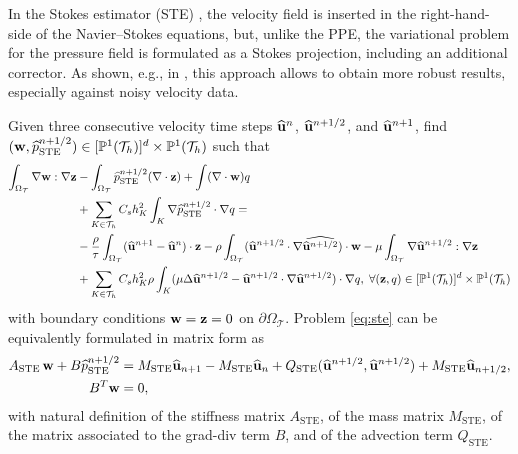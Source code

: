 In the Stokes estimator (STE) \cite{svihlova_2016}, the velocity field is inserted in the right-hand-side of the Navier--Stokes equations, but, unlike the PPE, the 
variational problem for the pressure field is formulated as a Stokes projection, including an additional corrector. As shown, e.g.,  in \cite{bertoglio2018relative}, this approach allows to 
obtain more robust results, especially against noisy velocity data.
\begin{problem}[STE]
  \label{def:ste}
    Given three consecutive velocity time steps $\widehat{\mathbf{u}}^{n}$, $\widehat{\mathbf{u}}^{n+1/2}$, and $\widehat{\mathbf{u}}^{n+1}$, find $(\mathbf{w},\widehat{p}^{n+1/2}_{\text{STE}})\in [\mathbb{P}^1(\mathcal{T}_h)]^d \times \mathbb{P}^1(\mathcal{T}_h)$ such that
  \begin{equation}\label{eq:ste-weak}
  \begin{aligned}
    \int_{\Omega_{\mathcal T}} \nabla\mathbf{w}:\nabla\mathbf{z} &- \int_{\Omega_{\mathcal T}} \widehat{p}^{n+1/2}_{\text{STE}}(\nabla\cdot\mathbf{z})+\int(\nabla\cdot\mathbf{w})q\\
     &+ \sum_{K\in\mathcal{T}_h}C_s h^2_K\int_K \nabla \widehat{p}^{n+1/2}_{\text{STE}}\cdot\nabla q=\\
     &-\frac{\rho}{\tau}\int_{\Omega_{\mathcal T}} (\widehat{\mathbf{u}}^{n+1}-\widehat{\mathbf{u}}^{n})\cdot\mathbf{z} - \rho\int_{\Omega_{\mathcal T}} (\widehat{\mathbf{u}}^{n+1/2}\cdot\nabla\widehat{\widehat{\mathbf{u}}^{n+1/2}})\cdot\mathbf{w}-\mu\int_{\Omega_{\mathcal T}} \nabla\widehat{\mathbf{u}}^{n+1/2}:\nabla\mathbf{z}\\
     &+\sum_{K\in\mathcal{T}_h}C_s h^2_K\rho\int_K (\mu\Delta\widehat{\mathbf{u}}^{n+1/2}-\widehat{\mathbf{u}}^{n+1/2}\cdot\nabla\widehat{\mathbf{u}}^{n+1/2})\cdot\nabla q,
\;     \forall (\mathbf{z},q) \in [\mathbb{P}^1(\mathcal{T}_h)]^d \times \mathbb{P}^1(\mathcal{T}_h)
  \end{aligned}
  \end{equation}
    with boundary conditions $\mathbf{w}=\mathbf{z}=0$ on $\partial \Omega_{\mathcal T}$. %
Problem \eqref{eq:ste} can be equivalently formulated in matrix form as
  \begin{equation}\label{eq:ste}
    \begin{aligned}
     A_{\text{STE}}\,\mathbf{w} + B \widehat{p}^{n+1/2}_{\text{STE}} &= M_{\text{STE}}\widehat{\mathbf{u}}_{n+1} - M_{\text{STE}}\widehat{\mathbf{u}}_{n} + Q_{\text{STE}}(\widehat{\mathbf{u}}^{n+1/2}, \widehat{\mathbf{u}}^{n+1/2}) + M_{\text{STE}}\widehat{\mathbf{u}}_{n+1/2},\\
     B^T\mathbf{w} &= 0,
  \end{aligned}
  \end{equation}
with natural definition of the stiffness matrix $A_{\text{STE}}$, of the mass matrix $M_{\text{STE}}$, of 
the matrix associated to the grad-div term $B$, and of the advection term $Q_{\text{STE}}$. 
 \end{problem} 
  
